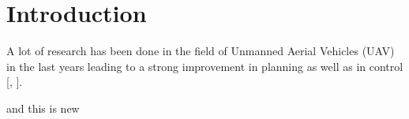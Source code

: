
\chapter{Introduction}\label{sec:introduction}

A lot of research has been done in the field of Unmanned Aerial Vehicles (UAV) in the last years leading to a strong improvement in planning \cite{he} as well as in control [\cite{colling}, \cite{lup}]. 

and this is new

